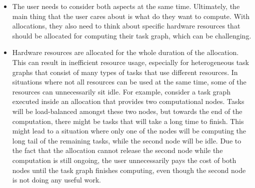 \begin{itemize}
	\item The user needs to consider both aspects at the same time. Ultimately, the main thing that the user
	      cares about is what do they want to compute. With allocations, they also need to think about
	      specific hardware resources that should be allocated for computing their task graph, which can be
	      challenging.
	\item Hardware resources are allocated for the whole duration of the allocation. This can result in
	      inefficient resource usage, especially for heterogeneous task graphs that consist of many types of
	      tasks that use different resources. In situations where not all resources can be used at the same
	      time, some of the resources can unnecessarily sit idle. For example, consider a task graph executed
	      inside an allocation that provides two computational nodes. Tasks will be load-balanced amongst
	      these two nodes, but towards the end of the computation, there might be tasks that will take a long
	      time to finish. This might lead to a situation where only one of the nodes will be computing the
	      long tail of the remaining tasks, while the second node will be idle. Due to the fact that the
	      allocation cannot release the second node while the computation is still ongoing, the user
	      unnecessarily pays the cost of both nodes until the task graph finishes computing, even though the
	      second node is not doing any useful work.


\end{itemize}
